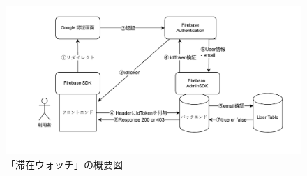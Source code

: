 \begin{figure}[h]
  \centering  %
  \includegraphics[clip,scale = 0.7]{image/userLogin.pdf}
  \caption{「滞在ウォッチ」の概要図}    \label{StayWatchOverview}
\end{figure}